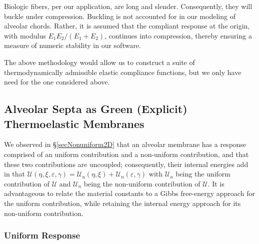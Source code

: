 Biologic fibers, per our application, are long and slender.  Consequently, they will buckle under compression.  Buckling is not accounted for in our modeling of alveolar chords.  Rather, it is assumed that the compliant response at the origin, with modulus $E_1 E_2 / ( E_1 + E_2 )$, continues into compression, thereby ensuring a measure of numeric stability in our software.

The above methodology would allow us to construct a suite of thermo\-dynamically admissible elastic compliance functions, but we only have need for the one considered above.

\subsection{Alveolar Septa as Green (Explicit) Thermoelastic Membranes}

We observed in \S\ref{secNonuniform2D} that an alveolar membrane has a response comprised of an uniform contribution and a non-uniform contribution, and that these two contributions are uncoupled; consequently, their internal energies add in that $\mathcal{U} (\eta , \xi , \varepsilon , \gamma) = \mathcal{U}_u (\eta , \xi) + \mathcal{U}_n (\varepsilon , \gamma)$ with $\mathcal{U}_u$ being the uniform contribution of $\mathcal{U}$ and $\mathcal{U}_n$ being the non-uniform contribution of $\mathcal{U}$.  It is advantageous to relate the material constants to a Gibbs free-energy approach for the uniform contribution, while retaining the internal energy approach for its non-uniform contribution.

\subsubsection{Uniform Response}

